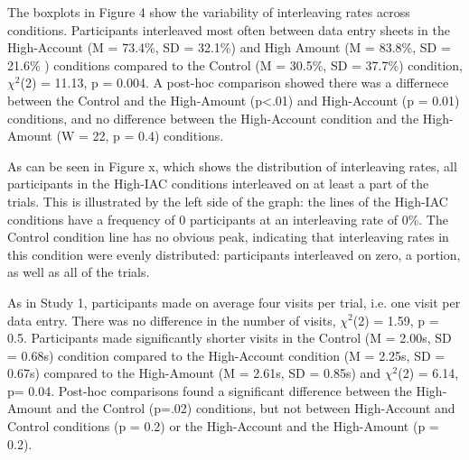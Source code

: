 The boxplots in Figure 4 show the variability of interleaving rates across conditions. Participants interleaved most often between data entry sheets in the High-Account (M = 73.4\%, SD = 32.1\%) and High Amount (M = 83.8\%, SD = 21.6\% ) conditions compared to the Control (M = 30.5\%, SD = 37.7\%) condition, $\chi^2$(2) = 11.13, p = 0.004. A post-hoc comparison showed there was a differnece between the Control and the High-Amount (p<.01) and High-Account (p = 0.01) conditions, and no difference between the High-Account condition and the High-Amount (W = 22, p = 0.4) conditions.

As can be seen in Figure x, which shows the distribution of interleaving rates, all participants in the High-IAC conditions interleaved on at least a part of the trials. This is illustrated by the left side of the graph: the lines of the High-IAC conditions have a frequency of 0 participants at an interleaving rate of 0\%. The Control condition line has no obvious peak, indicating that interleaving rates in this condition were evenly distributed: participants interleaved on zero, a portion, as well as all of the trials.

As in Study 1, participants made on average four visits per trial, i.e. one visit per data entry. There was no difference in the number of visits, $\chi^2$(2) = 1.59, p = 0.5. Participants made significantly shorter visits in the Control (M = 2.00s, SD = 0.68s) condition compared to the High-Account condition (M = 2.25s, SD = 0.67s) compared to the High-Amount (M = 2.61s, SD = 0.85s) and  $\chi^2$(2) = 6.14, p= 0.04. Post-hoc comparisons found a significant difference between  the High-Amount and the Control (p=.02) conditions, but not between High-Account and Control conditions (p = 0.2) or the High-Account and the High-Amount (p = 0.2).

%

